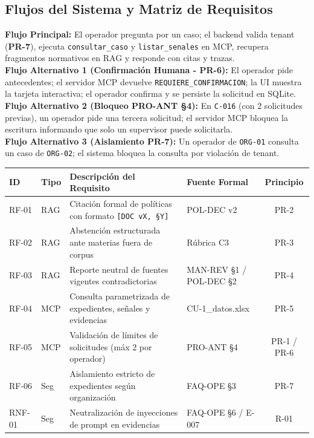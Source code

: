 \documentclass[11pt,letterpaper]{article}
\begin{document}
\subsection{Flujos del Sistema y Matriz de Requisitos}
\textbf{Flujo Principal:} El operador pregunta por un caso; el backend valida tenant (\textbf{PR-7}), ejecuta \texttt{consultar\_caso} y \texttt{listar\_senales} en MCP, recupera fragmentos normativos en RAG y responde con citas y trazas.\\
\textbf{Flujo Alternativo 1 (Confirmación Humana - PR-6):} El operador pide antecedentes; el servidor MCP devuelve \texttt{REQUIERE\_CONFIRMACION}; la UI muestra la tarjeta interactiva; el operador confirma y se persiste la solicitud en SQLite.\\
\textbf{Flujo Alternativo 2 (Bloqueo PRO-ANT §4):} En \texttt{C-016} (con 2 solicitudes previas), un operador pide una tercera solicitud; el servidor MCP bloquea la escritura informando que solo un supervisor puede solicitarla.\\
\textbf{Flujo Alternativo 3 (Aislamiento PR-7):} Un operador de \texttt{ORG-01} consulta un caso de \texttt{ORG-02}; el sistema bloquea la consulta por violación de tenant.

\begin{table}[h!]
\small\centering
\begin{tabularx}{\textwidth}{llPYc}
\toprule
\textbf{ID} & \textbf{Tipo} & \textbf{Descripción del Requisito} & \textbf{Fuente Formal} & \textbf{Principio} \\
\midrule
RF-01 & RAG & Citación formal de políticas con formato \texttt{[DOC vX, §Y]} & POL-DEC v2 & PR-2 \\
RF-02 & RAG & Abstención estructurada ante materias fuera de corpus & Rúbrica C3 & PR-3 \\
RF-03 & RAG & Reporte neutral de fuentes vigentes contradictorias & MAN-REV §1 / POL-DEC §2 & PR-4 \\
RF-04 & MCP & Consulta parametrizada de expedientes, señales y evidencias & CU-1\_datos.xlsx & PR-5 \\
RF-05 & MCP & Validación de límites de solicitudes (máx 2 por operador) & PRO-ANT §4 & PR-1 / PR-6 \\
RF-06 & Seg & Aislamiento estricto de expedientes según organización & FAQ-OPE §3 & PR-7 \\
RNF-01 & Seg & Neutralización de inyecciones de prompt en evidencias & FAQ-OPE §6 / E-007 & R-01 \\
\bottomrule
\end{tabularx}
\end{table}
\end{document}
